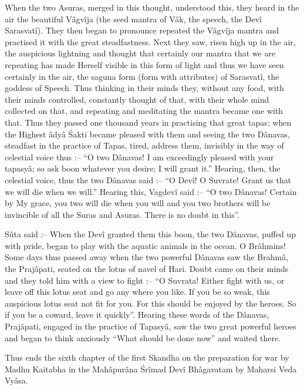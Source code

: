 When the two Asuras, merged in this thought, understood this, they heard in the air the beautiful V\^agv\^ija (the seed mantra of V\^ak, the speech, the Dev\^i Sarasvat\^i). They then began to pronounce repeated the V\^agv\^ija mantra and practised it with the great steadfastness. Next they saw, risen high up in the air, the auspicious lightning and thought that certainly our mantra that we are repeating has made Herself visible in this form of light and thus we have seen certainly in the air, the saguna form (form with attributes) of Sarasvat\^i, the goddess of Speech. Thus thinking in their minds they, without any food, with their minds controlled, constantly thought of that, with their whole mind collected on that, and repeating and meditating the mantra became one with that. Thus they passed one thousand years in practising that great tapas; when the Highest \^ady\^a \'Sakti became pleased with them and seeing the two D\^anavas, steadfast in the practice of Tapas, tired, address them, invisibly in the way of celestial voice thus :-- ``O two D\^anavas! I am exceedingly pleased with your tapasy\^a; so ask boon whatever you desire; I will grant it.'' Hearing, then, the celestial voice, thus the two D\^anavas said :-- ``O Dev\^i! O Suvrate! Grant us that we will die when we will.'' Hearing this, Vagdev\^i said :-- ``O two D\^anavas! Certain by My grace, you two will die when you will and you two brothers will be invincible of all the Suras and Asuras. There is no doubt in this''.

S\^uta said :-- When the Dev\^i granted them this boon, the two D\^anavas, puffed up with pride, began to play with the aquatic animals in the ocean. O Br\^ahmins! Some days thus passed away when the two powerful D\^anavas saw the Brahm\^a, the Praj\^apati, seated on the lotus of navel of Hari. Doubt came on their minds and they told him with a view to fight :-- ``O Suvrata! Either fight with us, or leave off this lotus seat and go any where you like. If you be so weak, this auspicious lotus seat not fit for you. For this should be enjoyed by the heroes. So if you be a coward, leave it quickly''. Hearing these words of the D\^anavas, Praj\^apati, engaged in the practice of Tapasy\^a, saw the two great powerful heroes and began to think anxiously ``What should be done now'' and waited there.

Thus ends the sixth chapter of the first Skandha on the preparation for war by Madhu Kaitabha in the Mah\^apur\^ana \'Sr\^imad Dev\^i Bh\^agavatam by Maharsi Veda Vy\^asa.